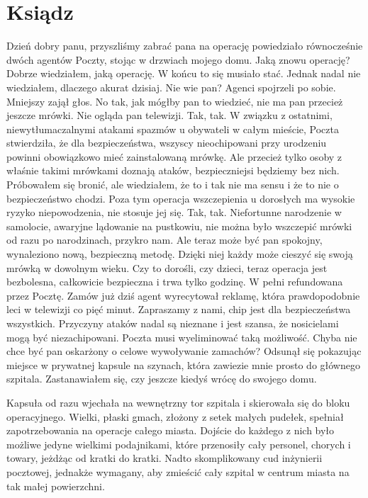 \chapter{Ksiądz} 


\begin{dialogue}
\ds{} Dzień dobry panu, przyszliśmy zabrać pana na operację \dm{} powiedziało równocześnie dwóch agentów Poczty, stojąc w drzwiach mojego domu.
\ds{} Jaką znowu operację? \dm{} Dobrze wiedziałem, jaką operację. W końcu to się musiało stać. Jednak nadal nie wiedziałem, dlaczego akurat dzisiaj.
\ds{} Nie wie pan? \dm{} Agenci spojrzeli po sobie. Mniejszy zajął głos. \dm{} No tak, jak mógłby pan to wiedzieć, nie ma pan przecież jeszcze mrówki. Nie ogląda pan telewizji.
Tak, tak.
W związku z ostatnimi, niewytłumaczalnymi atakami spazmów u obywateli w całym mieście, Poczta stwierdziła, że dla bezpieczeństwa, 
wszyscy nieochipowani przy urodzeniu powinni obowiązkowo mieć zainstalowaną mrówkę.
\ds{} Ale przecież tylko osoby z właśnie takimi mrówkami doznają ataków, bezpieczniejsi będziemy bez nich. \dm{} Próbowałem się bronić, ale wiedziałem, że
to i tak nie ma sensu i że to nie o bezpieczeństwo chodzi. \dm{} Poza tym operacja wszczepienia u dorosłych ma wysokie ryzyko niepowodzenia, nie stosuje jej się.
\ds{} Tak, tak. Niefortunne narodzenie w samolocie, awaryjne lądowanie na pustkowiu, nie można było wszczepić mrówki od razu po narodzinach, przykro nam.
Ale teraz może być pan spokojny, wynaleziono nową, bezpieczną metodę. Dzięki niej każdy może cieszyć się swoją mrówką w dowolnym wieku.
Czy to dorośli, czy dzieci, teraz operacja jest bezbolesna, całkowicie bezpieczna i trwa tylko godzinę.
W pełni refundowana przez Pocztę. Zamów już dziś \dm{} agent wyrecytował reklamę, która prawdopodobnie leci w telewizji co pięć minut. \dm{}
Zapraszamy z nami, chip jest dla bezpieczeństwa wszystkich. Przyczyny ataków nadal są nieznane i jest szansa, że nosicielami mogą być niezachipowani.
Poczta musi wyeliminować taką możliwość.
Chyba nie chce być pan oskarżony o celowe wywoływanie zamachów? \dm{} Odsunął się pokazując miejsce w prywatnej kapsule na szynach, która zawiezie mnie prosto do 
głównego szpitala. Zastanawiałem się, czy jeszcze kiedyś wrócę do swojego domu.
\end{dialogue}

\divider{}

Kapsuła od razu wjechała na wewnętrzny tor szpitala i skierowała się do bloku operacyjnego. 
Wielki, płaski gmach, złożony z setek małych pudełek, spełniał zapotrzebowania na operacje całego miasta.
Dojście do każdego z nich było możliwe jedyne wielkimi podajnikami, które przenosiły cały personel, chorych i towary, jeżdżąc od kratki do kratki.
Nadto skomplikowany cud inżynierii pocztowej, jednakże wymagany, aby zmieścić cały szpital w centrum miasta na tak małej powierzchni.

